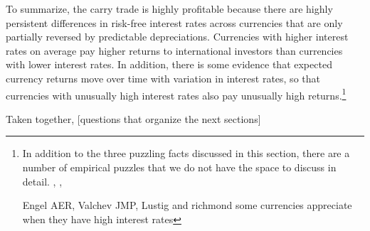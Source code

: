 To summarize, the carry trade is highly profitable because there are 
highly persistent differences in risk-free interest rates across 
currencies that are only partially reversed by predictable 
depreciations. Currencies with higher interest rates on average pay 
higher returns to international investors than currencies with lower 
interest rates. In addition, there is some evidence that expected 
currency returns move over time with variation in interest rates, 
so that currencies with unusually high interest rates also pay 
unusually high returns.\footnote{In addition to the three puzzling
facts discussed in this section, there are a number of empirical 
puzzles that we do not have the space to discuss in detail. 
\citet{LRV2014}, \citet{ChinnMeredith2004}, \citet{LustigStathopoulosVerdelhan2019}
\citet{}

Engel AER, Valchev JMP, 
Lustig and richmond some currencies appreciate when they have 
high interest rates}

Taken together, [questions that organize the next sections]

